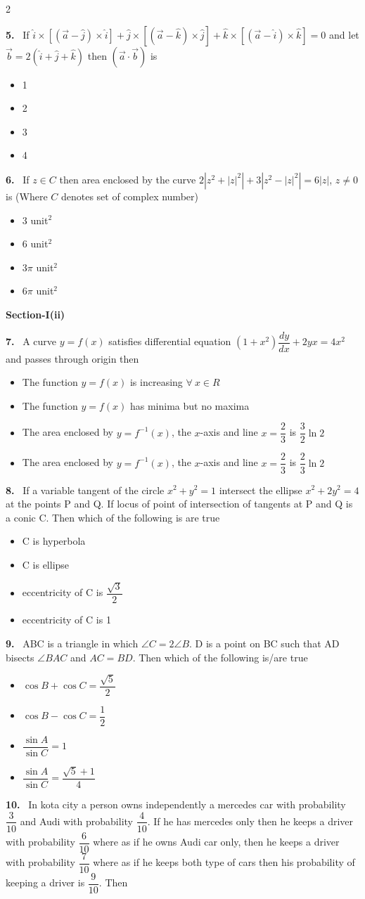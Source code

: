 \documentclass[10pt]{extarticle}
\newcommand{\sect}[1]{\par\smallskip\noindent\textbf{#1}\par}
\newcommand{\qn}[1]{\par\smallskip\noindent\textbf{#1.}~}
\newenvironment{qoptions}{\begin{itemize}[leftmargin=1.8em,itemsep=1pt,topsep=2pt,label={}]}{\end{itemize}}
\newcommand{\opt}[2]{\item[(#1)] #2}
\begin{document}
\begin{multicols}{2}
\qn{5} If $\hat i\times[(\vec a-\hat j)\times\hat i]+\hat j\times[(\vec a-\hat k)\times\hat j]+\hat k\times[(\vec a-\hat i)\times\hat k]=0$ and let $\vec b=2(\hat i+\hat j+\hat k)$ then $(\vec a\cdot\vec b)$ is
\begin{qoptions}
\opt{A}{1}
\opt{B}{2}
\opt{C}{3}
\opt{D}{4}
\end{qoptions}
\qn{6} If $z\in C$ then area enclosed by the curve $2\left|z^2+|z|^2\right|+3\left|z^2-|z|^2\right|=6|z|$, $z\neq0$ is (Where $C$ denotes set of complex number)
\begin{qoptions}
\opt{A}{3 unit$^2$}
\opt{B}{6 unit$^2$}
\opt{C}{$3\pi$ unit$^2$}
\opt{D}{$6\pi$ unit$^2$}
\end{qoptions}
\sect{Section-I(ii)}
\qn{7} A curve $y=f(x)$ satisfies differential equation $(1+x^2)\dfrac{dy}{dx}+2yx=4x^2$ and passes through origin then
\begin{qoptions}
\opt{A}{The function $y=f(x)$ is increasing $\forall\ x\in R$}
\opt{B}{The function $y=f(x)$ has minima but no maxima}
\opt{C}{The area enclosed by $y=f^{-1}(x)$, the $x$-axis and line $x=\dfrac23$ is $\dfrac32\ln2$}
\opt{D}{The area enclosed by $y=f^{-1}(x)$, the $x$-axis and line $x=\dfrac23$ is $\dfrac23\ln2$}
\end{qoptions}
\qn{8} If a variable tangent of the circle $x^2+y^2=1$ intersect the ellipse $x^2+2y^2=4$ at the points P and Q. If locus of point of intersection of tangents at P and Q is a conic C. Then which of the following is are true
\begin{qoptions}
\opt{A}{C is hyperbola}
\opt{B}{C is ellipse}
\opt{C}{eccentricity of C is $\dfrac{\sqrt3}{2}$}
\opt{D}{eccentricity of C is 1}
\end{qoptions}
\qn{9} ABC is a triangle in which $\angle C=2\angle B$. D is a point on BC such that AD bisects $\angle BAC$ and $AC=BD$. Then which of the following is/are true
\begin{qoptions}
\opt{A}{$\cos B+\cos C=\dfrac{\sqrt5}{2}$}
\opt{B}{$\cos B-\cos C=\dfrac12$}
\opt{C}{$\dfrac{\sin A}{\sin C}=1$}
\opt{D}{$\dfrac{\sin A}{\sin C}=\dfrac{\sqrt5+1}{4}$}
\end{qoptions}
\qn{10} In kota city a person owns independently a mercedes car with probability $\dfrac{3}{10}$ and Audi with probability $\dfrac{4}{10}$. If he has mercedes only then he keeps a driver with probability $\dfrac{6}{10}$ where as if he owns Audi car only, then he keeps a driver with probability $\dfrac{7}{10}$ where as if he keeps both type of cars then his probability of keeping a driver is $\dfrac{9}{10}$. Then

\end{multicols}
\end{document}
